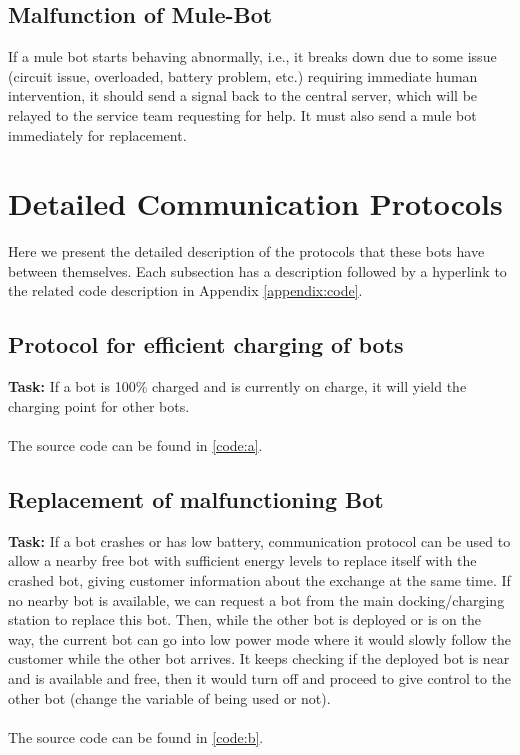 \documentclass{article}
\begin{document}
\subsection{Malfunction of Mule-Bot}
If a mule bot starts behaving abnormally, i.e., it breaks down due to some issue (circuit issue, overloaded, battery problem, etc.) requiring immediate human intervention, it should send a signal back to the central server, which will be relayed to the service team requesting for help. It must also send a mule bot immediately for replacement.

\section{Detailed Communication Protocols}
Here we present the detailed description of the protocols that these bots have between themselves. Each subsection has a description followed by a hyperlink to the related code description in Appendix \ref{appendix:code}.
\subsection{ Protocol for efficient charging of bots}
\textbf{Task: } If a bot is 100\% charged and is currently on charge, it will yield the charging point for other bots. \\ \\
The source code can be found in \ref{code:a}.

\subsection{Replacement of malfunctioning Bot}
\textbf{Task: } If a bot crashes or has low battery, communication protocol can be used to allow a nearby free bot with sufficient energy levels to replace itself with the crashed  bot, giving customer information about the exchange at the same time. If no nearby bot is available, we can request a bot from the main docking/charging station to replace this bot. Then, while the other bot is deployed or is on the way, the current bot can go into low power mode where it would slowly follow the customer while the other bot arrives. It keeps checking if the deployed bot is near and is available and free, then it would turn off and proceed to give control to the other bot (change the variable of being used or not).
\\
\\
The source code can be found in \ref{code:b}.
\end{document}
